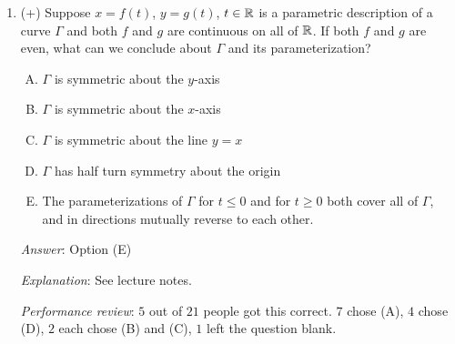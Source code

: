 \documentclass[10pt]{amsart}
\begin{document}
\begin{enumerate}
  {\em Answer}: Option (D)

  {\em Explanation}: In all the other cases, we can elucidate an
  algebraic relationship between the variables.

  For option (A), we can set both $\cos t$ and $\sin t$ as rational
  functions in $\tan(t/2)$. In fact, the rational functions in
  $\tan(t/2)$ approach works for options (B) and (C) as well, though
  there are simpler approaches in those cases. The approach does not
  work for option (D).

  {\em Performance review}: $11$ out of $21$ people got this
  correct. $8$ chose (E), $1$ chose (B), $1$ left the question blank.

\item (+) Suppose $x = f(t)$, $y = g(t)$, $t \in \mathbb{R}$ is a parametric
  description of a curve $\Gamma$ and both $f$ and $g$ are continuous
  on all of $\mathbb{R}$. If both $f$ and $g$ are even, what can we conclude
  about $\Gamma$ and its parameterization?

  \begin{enumerate}[(A)]
  \item $\Gamma$ is symmetric about the $y$-axis
  \item $\Gamma$ is symmetric about the $x$-axis
  \item $\Gamma$ is symmetric about the line $y = x$
  \item $\Gamma$ has half turn symmetry about the origin
  \item The parameterizations of $\Gamma$ for $t \le 0$ and for $t \ge
    0$ both cover all of $\Gamma$, and in directions mutually reverse
    to each other.
  \end{enumerate}

  {\em Answer}: Option (E)

  {\em Explanation}: See lecture notes.

  {\em Performance review}: $5$ out of $21$ people got this
  correct. $7$ chose (A), $4$ chose (D), $2$ each chose (B) and (C),
  $1$ left the question blank.
\end{enumerate}
\end{document}

